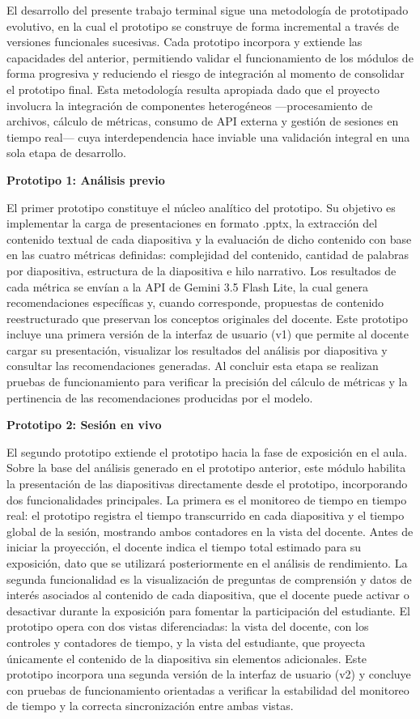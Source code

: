 \documentclass[11pt]{article}
\begin{document}
El desarrollo del presente trabajo terminal sigue una metodología de prototipado evolutivo, en la cual el prototipo se construye de forma incremental a través de versiones funcionales sucesivas. Cada prototipo incorpora y extiende las capacidades del anterior, permitiendo validar el funcionamiento de los módulos de forma progresiva y reduciendo el riesgo de integración al momento de consolidar el prototipo final. Esta metodología resulta apropiada dado que el proyecto involucra la integración de componentes heterogéneos —procesamiento de archivos, cálculo de métricas, consumo de API externa y gestión de sesiones en tiempo real— cuya interdependencia hace inviable una validación integral en una sola etapa de desarrollo.

\textbf{Prototipo 1: Análisis previo}

El primer prototipo constituye el núcleo analítico del prototipo. Su objetivo es implementar la carga de presentaciones en formato .pptx, la extracción del contenido textual de cada diapositiva y la evaluación de dicho contenido con base en las cuatro métricas definidas: complejidad del contenido, cantidad de palabras por diapositiva, estructura de la diapositiva e hilo narrativo. Los resultados de cada métrica se envían a la API de Gemini 3.5 Flash Lite, la cual genera recomendaciones específicas y, cuando corresponde, propuestas de contenido reestructurado que preservan los conceptos originales del docente. Este prototipo incluye una primera versión de la interfaz de usuario (v1) que permite al docente cargar su presentación, visualizar los resultados del análisis por diapositiva y consultar las recomendaciones generadas. Al concluir esta etapa se realizan pruebas de funcionamiento para verificar la precisión del cálculo de métricas y la pertinencia de las recomendaciones producidas por el modelo.

\textbf{Prototipo 2: Sesión en vivo}

El segundo prototipo extiende el prototipo hacia la fase de exposición en el aula. Sobre la base del análisis generado en el prototipo anterior, este módulo habilita la presentación de las diapositivas directamente desde el prototipo, incorporando dos funcionalidades principales. La primera es el monitoreo de tiempo en tiempo real: el prototipo registra el tiempo transcurrido en cada diapositiva y el tiempo global de la sesión, mostrando ambos contadores en la vista del docente. Antes de iniciar la proyección, el docente indica el tiempo total estimado para su exposición, dato que se utilizará posteriormente en el análisis de rendimiento. La segunda funcionalidad es la visualización de preguntas de comprensión y datos de interés asociados al contenido de cada diapositiva, que el docente puede activar o desactivar durante la exposición para fomentar la participación del estudiante. El prototipo opera con dos vistas diferenciadas: la vista del docente, con los controles y contadores de tiempo, y la vista del estudiante, que proyecta únicamente el contenido de la diapositiva sin elementos adicionales. Este prototipo incorpora una segunda versión de la interfaz de usuario (v2) y concluye con pruebas de funcionamiento orientadas a verificar la estabilidad del monitoreo de tiempo y la correcta sincronización entre ambas vistas.
\end{document}
